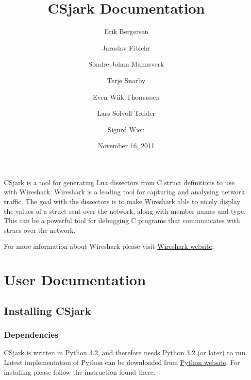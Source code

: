 \documentclass[A4paper,10pt,english]{sphinxmanual}
\title{CSjark Documentation}
\date{November 16, 2011}
\author{Erik Bergersen \and Jaroslav Fibichr \and Sondre Johan Mannsverk \and Terje Snarby \and Even Wiik Thomassen \and Lars Solvoll Tønder \and Sigurd Wien}
\begin{document}
{}\label{index::doc}

\newpage    

CSjark is a tool for generating Lua dissectors from C struct definitions to use with Wireshark. Wireshark is a leading tool for capturing and analysing network traffic. The goal with the dissectors is to make Wireshark able to nicely display the values of a struct sent over the network, along with member names and type. This can be a powerful tool for debugging C programs that communicates with strucs over the network.

For more information about Wireshark please visit \href{http://www.wireshark.org}{Wireshark website}.


\section{User Documentation}
\label{index:user-documentation}\label{index:welcome-to-csjark-s-documentation}

\subsection{Installing CSjark}
\label{user/install::doc}\label{user/install:installing-csjark}

\subsubsection{Dependencies}
\label{user/install:dependencies}
CSjark is written in Python 3.2, and therefore needs Python 3.2 (or later) to run. Latest implementation of Python can be downloaded from \href{http://www.python.org/}{Python website}. For installing please follow the instruction found there.
\end{document}
